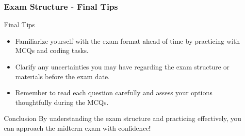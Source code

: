 \documentclass[aspectratio=169]{beamer}
\begin{document}
\begin{frame}[fragile]
    \frametitle{Exam Structure - Final Tips}
    \begin{block}{Final Tips}
        \begin{itemize}
            \item Familiarize yourself with the exam format ahead of time by practicing with MCQs and coding tasks.
            \item Clarify any uncertainties you may have regarding the exam structure or materials before the exam date.
            \item Remember to read each question carefully and assess your options thoughtfully during the MCQs.
        \end{itemize}
    \end{block}
    \begin{block}{Conclusion}
        By understanding the exam structure and practicing effectively, you can approach the midterm exam with confidence!
    \end{block}
\end{frame}
\end{document}
